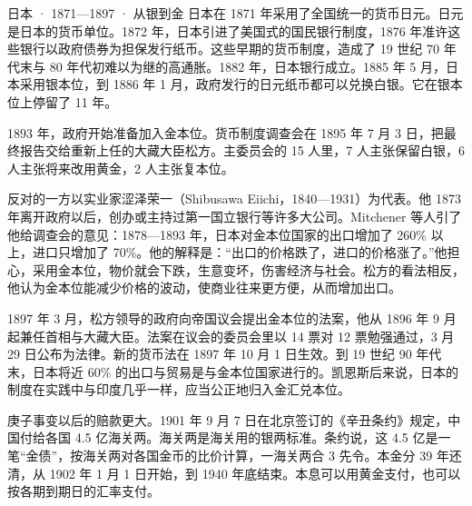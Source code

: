 \begin{case}{日本 · 1871—1897 · 从银到金}
日本在 1871 年采用了全国统一的货币日元\cite{mitchener2009}。日元是日本的货币单位。1872 年，日本引进了美国式的国民银行制度，1876 年准许这些银行以政府债券为担保发行纸币\cite{mitchener2009}。这些早期的货币制度，造成了 19 世纪 70 年代末与 80 年代初难以为继的高通胀\cite{mitchener2009}。1882 年，日本银行成立\cite{mitchener2009}。1885 年 5 月，日本采用银本位，到 1886 年 1 月，政府发行的日元纸币都可以兑换白银\cite{mitchener2009}。它在银本位上停留了 11 年\cite{mitchener2009}。

1893 年，政府开始准备加入金本位\cite{mitchener2009}。货币制度调查会在 1895 年 7 月 3 日，把最终报告交给重新上任的大藏大臣松方\cite{mitchener2009}。主委员会的 15 人里，7 人主张保留白银，6 人主张将来改用黄金，2 人主张复本位\cite{mitchener2009}。

反对的一方以实业家涩泽荣一（Shibusawa Eiichi，1840—1931）为代表\cite{mitchener2009}。他 1873 年离开政府以后，创办或主持过第一国立银行等许多大公司\cite{mitchener2009}。Mitchener 等人引了他给调查会的意见：1878—1893 年，日本对金本位国家的出口增加了 260\% 以上，进口只增加了 70\%\cite{mitchener2009}。他的解释是：“出口的价格跌了，进口的价格涨了。”\cite{mitchener2009}他担心，采用金本位，物价就会下跌，生意变坏，伤害经济与社会\cite{mitchener2009}。松方的看法相反，他认为金本位能减少价格的波动，使商业往来更方便，从而增加出口\cite{mitchener2009}。

1897 年 3 月，松方领导的政府向帝国议会提出金本位的法案，他从 1896 年 9 月起兼任首相与大藏大臣\cite{mitchener2009}。法案在议会的委员会里以 14 票对 12 票勉强通过，3 月 29 日公布为法律\cite{mitchener2009}。新的货币法在 1897 年 10 月 1 日生效\cite{mitchener2009}。到 19 世纪 90 年代末，日本将近 60\% 的出口与贸易是与金本位国家进行的\cite{mitchener2009}。凯恩斯后来说，日本的制度在实践中与印度几乎一样，应当公正地归入金汇兑本位\cite{keynes1913}。
\end{case}

庚子事变以后的赔款更大。1901 年 9 月 7 日在北京签订的《辛丑条约》规定，中国付给各国 4.5 亿海关两\cite{boxer1901}。海关两是海关用的银两标准。条约说，这 4.5 亿是一笔“金债”，按海关两对各国金币的比价计算，一海关两合 3 先令\cite{boxer1901}。本金分 39 年还清，从 1902 年 1 月 1 日开始，到 1940 年底结束\cite{boxer1901}。本息可以用黄金支付，也可以按各期到期日的汇率支付\cite{boxer1901}。

